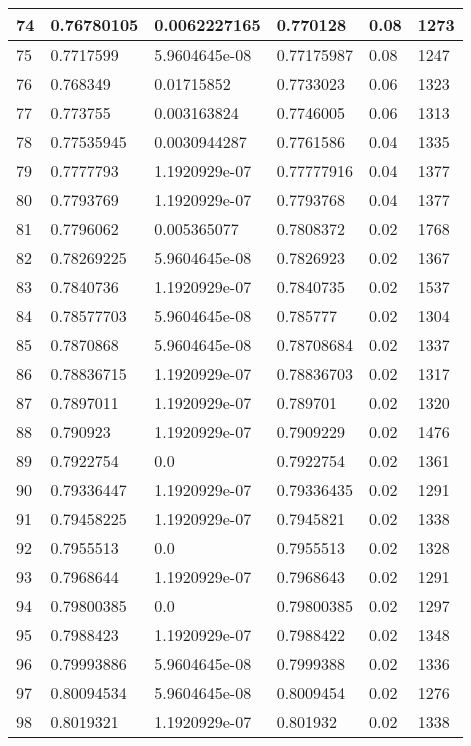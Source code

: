 \begin{longtable}{|l|l|l|l|l|l|}
74 & 0.76780105 & 0.0062227165 & 0.770128 & 0.08 & 1273 \\ \hline 
75 & 0.7717599 & 5.9604645e-08 & 0.77175987 & 0.08 & 1247 \\ \hline 
76 & 0.768349 & 0.01715852 & 0.7733023 & 0.06 & 1323 \\ \hline 
77 & 0.773755 & 0.003163824 & 0.7746005 & 0.06 & 1313 \\ \hline 
78 & 0.77535945 & 0.0030944287 & 0.7761586 & 0.04 & 1335 \\ \hline 
79 & 0.7777793 & 1.1920929e-07 & 0.77777916 & 0.04 & 1377 \\ \hline 
80 & 0.7793769 & 1.1920929e-07 & 0.7793768 & 0.04 & 1377 \\ \hline 
81 & 0.7796062 & 0.005365077 & 0.7808372 & 0.02 & 1768 \\ \hline 
82 & 0.78269225 & 5.9604645e-08 & 0.7826923 & 0.02 & 1367 \\ \hline 
83 & 0.7840736 & 1.1920929e-07 & 0.7840735 & 0.02 & 1537 \\ \hline 
84 & 0.78577703 & 5.9604645e-08 & 0.785777 & 0.02 & 1304 \\ \hline 
85 & 0.7870868 & 5.9604645e-08 & 0.78708684 & 0.02 & 1337 \\ \hline 
86 & 0.78836715 & 1.1920929e-07 & 0.78836703 & 0.02 & 1317 \\ \hline 
87 & 0.7897011 & 1.1920929e-07 & 0.789701 & 0.02 & 1320 \\ \hline 
88 & 0.790923 & 1.1920929e-07 & 0.7909229 & 0.02 & 1476 \\ \hline 
89 & 0.7922754 & 0.0 & 0.7922754 & 0.02 & 1361 \\ \hline 
90 & 0.79336447 & 1.1920929e-07 & 0.79336435 & 0.02 & 1291 \\ \hline 
91 & 0.79458225 & 1.1920929e-07 & 0.7945821 & 0.02 & 1338 \\ \hline 
92 & 0.7955513 & 0.0 & 0.7955513 & 0.02 & 1328 \\ \hline 
93 & 0.7968644 & 1.1920929e-07 & 0.7968643 & 0.02 & 1291 \\ \hline 
94 & 0.79800385 & 0.0 & 0.79800385 & 0.02 & 1297 \\ \hline 
95 & 0.7988423 & 1.1920929e-07 & 0.7988422 & 0.02 & 1348 \\ \hline 
96 & 0.79993886 & 5.9604645e-08 & 0.7999388 & 0.02 & 1336 \\ \hline 
97 & 0.80094534 & 5.9604645e-08 & 0.8009454 & 0.02 & 1276 \\ \hline 
98 & 0.8019321 & 1.1920929e-07 & 0.801932 & 0.02 & 1338 \\ \hline 

\end{longtable}
